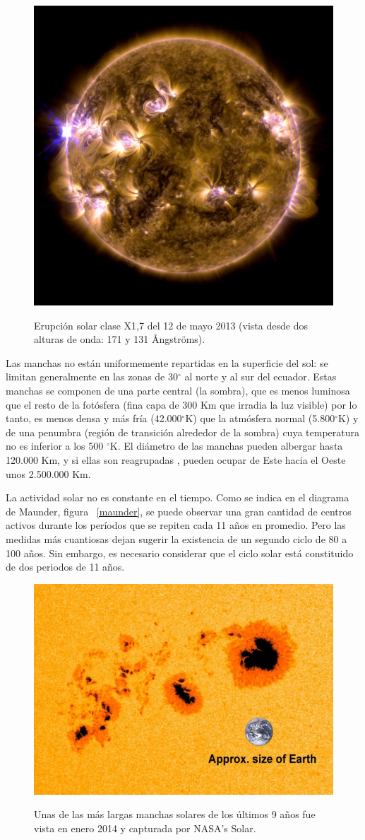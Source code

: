 \documentclass[a4paper,openright,12pt]{report}
\newcommand{\grad}{$^{\circ}$}
\begin{document}
\begin{figure}[H]
	\centering
	\includegraphics[width=0.47 \textwidth]{img/sol4.jpg}
	\caption{Erupción solar clase X1,7 del 12 de mayo 2013 (vista desde dos alturas de onda: 171 y 131 \AA ngströms). }\cite{NASA}
	\label{sol2}
\end{figure}


Las manchas no están uniformemente repartidas en la superficie del sol:  se limitan generalmente en las zonas de \mbox{30\grad}  al norte y al sur del ecuador. Estas manchas se componen de una parte central (la sombra), que es menos luminosa que el resto de la fotósfera (fina capa de 300 Km que  irradia la luz visible) por lo tanto, es menos densa y más fría (42.000\grad K) que la atmósfera normal (5.800\grad K) y de una penumbra (región de transición alrededor de la sombra) cuya temperatura no es inferior a los 500 \grad K. El diámetro de las manchas pueden albergar hasta 120.000 Km, y si ellas son reagrupadas , pueden ocupar de Este hacia el Oeste unos 2.500.000 Km.

La actividad solar no es constante en el tiempo. Como se indica en el diagrama de Maunder,  figura ~\ref{maunder}, se puede observar una gran cantidad de centros activos durante los períodos que se repiten cada  11 años en promedio. Pero las medidas más cuantiosas dejan sugerir la existencia de un segundo ciclo de 80 a 100 años. Sin embargo, es necesario  considerar que el ciclo solar está constituido de dos periodos de 11 años.

\begin{figure}[H]
	\centering
	\includegraphics[width=0.5 \textwidth]{img/sunspot.jpg}
	\caption{Unas de las más largas manchas solares de los últimos 9 años  fue vista en enero 2014 y capturada por NASA's Solar.  }\cite{NASA1}
	\label{sunspot}
\end{figure}
\end{document}

